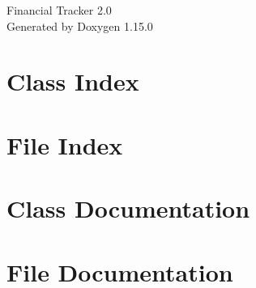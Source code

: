 \documentclass[twoside]{book}
\newcommand{\+}{\discretionary{\mbox{\scriptsize$\hookleftarrow$}}{}{}}
\newcommand{\clearemptydoublepage}{%
    \newpage{\pagestyle{empty}\cleardoublepage}%
  }
\begin{document}
  \raggedbottom
    \hypersetup{pageanchor=false,
                bookmarksnumbered=true,
                pdfencoding=unicode
               }
  \begin{titlepage}
  \vspace*{7cm}
  \begin{center}%
  {\Large Financial Tracker 2.\+0}\\
  \vspace*{1cm}
  {\large Generated by Doxygen 1.15.0}\\
  \end{center}
  \end{titlepage}
  \clearemptydoublepage
  \tableofcontents
  \clearemptydoublepage
  \hypersetup{pageanchor=true}

\chapter{Class Index}

\chapter{File Index}

\chapter{Class Documentation}


\chapter{File Documentation}




  \backmatter
  \newpage
  \clearemptydoublepage
  \printindex
\end{document}
